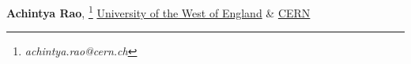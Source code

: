 \textbf{Achintya Rao}, \footnote{\textit{achintya.rao@cern.ch}} \href{http://uwe.ac.uk}{University of the West of England} \& \href{http://cern.ch}{CERN}\\
